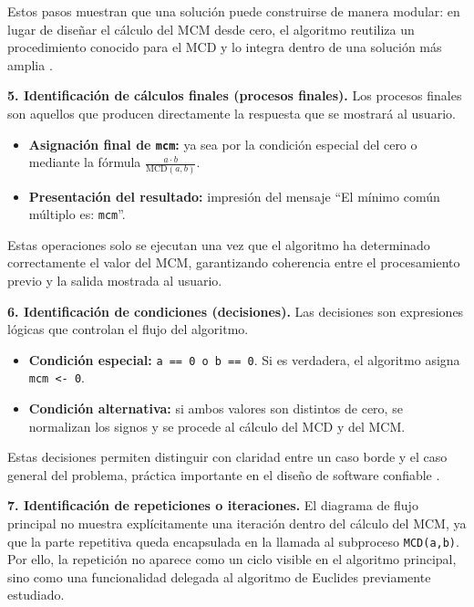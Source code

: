 \documentclass[12pt,twoside]{book}
\begin{document}
						\noindent
						Estos pasos muestran que una solución puede construirse de manera modular: en lugar de diseñar el cálculo del MCM desde cero, el algoritmo reutiliza un procedimiento conocido para el MCD y lo integra dentro de una solución más amplia \cite{Cormen2022Introduction,Sebesta2018Concepts}.
						
						\noindent
						\textbf{5. Identificación de cálculos finales (procesos finales).}
						Los procesos finales son aquellos que producen directamente la respuesta que se mostrará al usuario.
						
						\begin{itemize}
							\item \textbf{Asignación final de \texttt{mcm}:} ya sea por la condición especial del cero o mediante la fórmula \(\frac{a\cdot b}{\text{MCD}(a,b)}\).
							\item \textbf{Presentación del resultado:} impresión del mensaje ``El mínimo común múltiplo es: \texttt{mcm}''.
						\end{itemize}
						
						\noindent
						Estas operaciones solo se ejecutan una vez que el algoritmo ha determinado correctamente el valor del MCM, garantizando coherencia entre el procesamiento previo y la salida mostrada al usuario.
						
						\noindent
						\textbf{6. Identificación de condiciones (decisiones).}
						Las decisiones son expresiones lógicas que controlan el flujo del algoritmo.
						
						\begin{itemize}
							\item \textbf{Condición especial:} \texttt{a == 0 o b == 0}. Si es verdadera, el algoritmo asigna \texttt{mcm <- 0}.
							\item \textbf{Condición alternativa:} si ambos valores son distintos de cero, se normalizan los signos y se procede al cálculo del MCD y del MCM.
						\end{itemize}
						
						\noindent
						Estas decisiones permiten distinguir con claridad entre un caso borde y el caso general del problema, práctica importante en el diseño de software confiable \cite{Pressman2019Software,Sommerville2015Software}.
						
						\noindent
						\textbf{7. Identificación de repeticiones o iteraciones.}
						El diagrama de flujo principal no muestra explícitamente una iteración dentro del cálculo del MCM, ya que la parte repetitiva queda encapsulada en la llamada al subproceso \texttt{MCD(a,b)}. Por ello, la repetición no aparece como un ciclo visible en el algoritmo principal, sino como una funcionalidad delegada al algoritmo de Euclides previamente estudiado.
						
\end{document}
